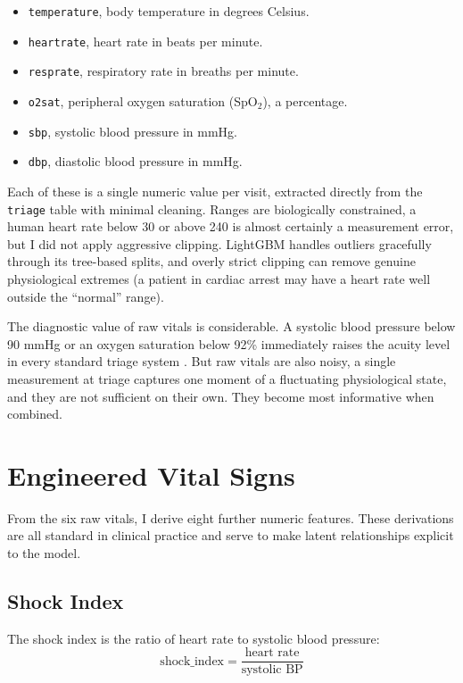 \begin{itemize}
 \item \texttt{temperature}, body temperature in degrees Celsius.
 \item \texttt{heartrate}, heart rate in beats per minute.
 \item \texttt{resprate}, respiratory rate in breaths per minute.
 \item \texttt{o2sat}, peripheral oxygen saturation (SpO$_2$), a percentage.
 \item \texttt{sbp}, systolic blood pressure in mmHg.
 \item \texttt{dbp}, diastolic blood pressure in mmHg.
\end{itemize}

Each of these is a single numeric value per visit, extracted directly from the \texttt{triage} table with minimal cleaning. Ranges are biologically constrained, a human heart rate below 30 or above 240 is almost certainly a measurement error, but I did not apply aggressive clipping. LightGBM handles outliers gracefully through its tree-based splits, and overly strict clipping can remove genuine physiological extremes (a patient in cardiac arrest may have a heart rate well outside the ``normal'' range).

The diagnostic value of raw vitals is considerable. A systolic blood pressure below 90 mmHg or an oxygen saturation below 92\% immediately raises the acuity level in every standard triage system \citep{rcp2017news2}. But raw vitals are also noisy, a single measurement at triage captures one moment of a fluctuating physiological state, and they are not sufficient on their own. They become most informative when combined.

\section{Engineered Vital Signs}

From the six raw vitals, I derive eight further numeric features. These derivations are all standard in clinical practice and serve to make latent relationships explicit to the model.

\subsection*{Shock Index}

The shock index is the ratio of heart rate to systolic blood pressure:
\[
\text{shock\_index} = \frac{\text{heart rate}}{\text{systolic BP}}
\]

